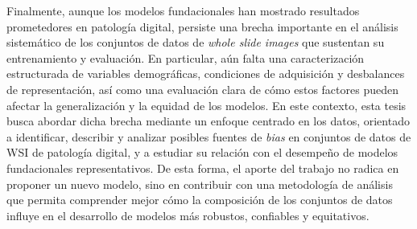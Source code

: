 Finalmente, aunque los modelos fundacionales han mostrado resultados prometedores en patología digital, persiste una brecha importante en el análisis sistemático de los conjuntos de datos de \textit{whole slide images} que sustentan su entrenamiento y evaluación. En particular, aún falta una caracterización estructurada de variables demográficas, condiciones de adquisición y desbalances de representación, así como una evaluación clara de cómo estos factores pueden afectar la generalización y la equidad de los modelos. En este contexto, esta tesis busca abordar dicha brecha mediante un enfoque centrado en los datos, orientado a identificar, describir y analizar posibles fuentes de \textit{bias} en conjuntos de datos de WSI de patología digital, y a estudiar su relación con el desempeño de modelos fundacionales representativos. De esta forma, el aporte del trabajo no radica en proponer un nuevo modelo, sino en contribuir con una metodología de análisis que permita comprender mejor cómo la composición de los conjuntos de datos influye en el desarrollo de modelos más robustos, confiables y equitativos.
